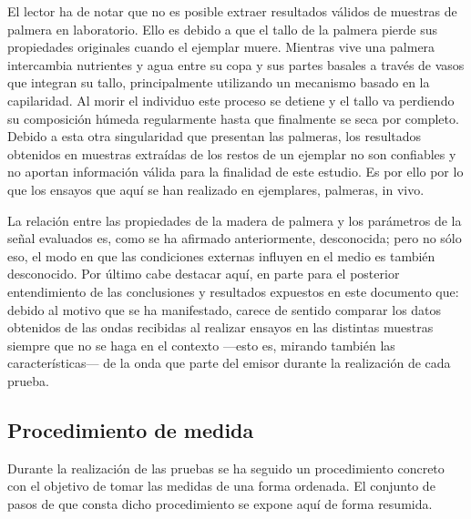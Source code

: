 El lector ha de notar que no es posible extraer resultados válidos de
muestras de palmera en laboratorio. Ello es debido a que el tallo de la
palmera pierde sus propiedades originales cuando el ejemplar muere.
Mientras vive una palmera intercambia nutrientes y agua entre su copa y sus
partes basales a través de vasos que integran su tallo, principalmente
utilizando un mecanismo basado en la capilaridad. Al morir el individuo
este proceso se detiene y el tallo va perdiendo su composición húmeda
regularmente hasta que finalmente se seca por completo. Debido a esta otra
singularidad que presentan las palmeras, los resultados obtenidos en
muestras extraídas de los restos de un ejemplar no son confiables y no
aportan información válida para la finalidad de este estudio. Es por ello
por lo que los ensayos que aquí se han realizado en ejemplares, palmeras,
in vivo.

La relación entre las propiedades de la madera de palmera y los parámetros
de la señal evaluados es, como se ha afirmado anteriormente, desconocida;
pero no sólo eso, el modo en que las condiciones externas influyen en el
medio es también desconocido. Por último cabe destacar aquí, en parte para
el posterior entendimiento de las conclusiones y resultados expuestos en
este documento que: debido al motivo que se ha manifestado, carece de
sentido comparar los datos obtenidos de las ondas recibidas al realizar
ensayos en las distintas muestras siempre que no se haga en el contexto
---esto es, mirando también las características--- de la onda que parte del
emisor durante la realización de cada prueba.


\subsection{Procedimiento de medida}

Durante la realización de las pruebas se ha seguido un procedimiento
concreto con el objetivo de tomar las medidas de una forma ordenada. El
conjunto de pasos de que consta dicho procedimiento se expone aquí de
forma resumida.

